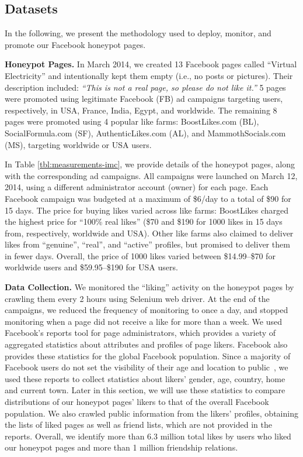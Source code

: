 \documentclass[twocolumn,10pt,letterpaper]{article}
\newcommand{\descr}[1]{\smallskip\noindent\textbf{#1}}
\begin{document}
\subsection{Datasets}\label{sec:data-imc}
In the following, we present the methodology used to deploy, monitor, and promote our Facebook honeypot pages.%

\descr{Honeypot Pages.} In March 2014, we created 13 Facebook pages called ``Virtual Electricity'' and intentionally kept them empty (i.e., no posts or pictures). Their description included: {\em ``This is not a real page, so please do not like it.''}
%
5 pages were promoted using legitimate Facebook (FB) ad campaigns targeting users, respectively, in USA, France, India, Egypt, and worldwide.
%
The remaining 8 pages were promoted using 4 popular like farms: BoostLikes.com (BL), SocialFormula.com (SF), AuthenticLikes.com (AL), and MammothSocials.com (MS), targeting worldwide or USA users.

%



In Table \ref{tbl:measurements-imc}, we provide details of the honeypot pages, along with the
corresponding ad campaigns. All campaigns were launched on March 12, 2014, using a different administrator account (owner) for each page. Each Facebook campaign was budgeted at a maximum of \$6/day to a total of \$90 for 15 days. The price for buying likes varied across like farms: BoostLikes charged the highest price for ``100\% real likes'' (\$70 and \$190 for 1000 likes in 15 days from, respectively, worldwide and USA).
%
Other like farms also claimed to deliver likes from ``genuine'', ``real'', and ``active'' profiles, but promised to deliver them in fewer days.
%
Overall, the price of 1000 likes varied between \$14.99--\$70 for worldwide users and \$59.95--\$190 for USA users.


\descr{Data Collection.} We monitored the ``liking'' activity on the honeypot pages by crawling them every 2 hours using Selenium web driver.
%
At the end of the campaigns, we reduced the frequency of monitoring to once a day, and stopped monitoring when a page did not receive a like for more than a week.
We used Facebook's reports tool for page administrators, which provides a variety of aggregated statistics
about attributes and profiles of page likers. Facebook also provides these statistics for the global Facebook population. Since a majority of Facebook users do not set the visibility of their age and location to public~\cite{Chaabane2012}, we used these reports to collect statistics about likers' gender, age, country, home and current town.
%
Later in this section, we will use these statistics to compare distributions of our honeypot pages' likers to that of the overall Facebook population.
We also crawled public information from the likers' profiles, obtaining the lists of liked pages as well as friend lists, which are not provided in the reports. Overall, we identify more than 6.3 million total likes by users who liked our honeypot pages and more than 1 million friendship relations. %
\end{document}

